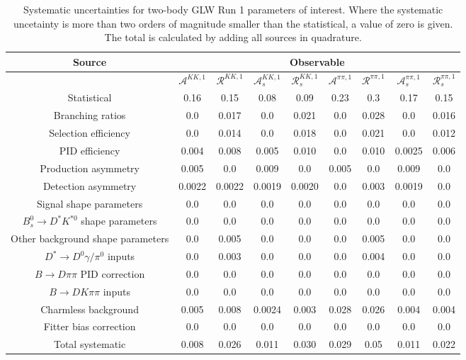 \begin{sidewaystable}
  \centering
  \begin{tabular}{ccccccccc}
      \toprule
      Source & \multicolumn{8}{c}{Observable} \\
      \midrule
       & $\mathcal{A}^{KK,1}$ & $\mathcal{R}^{KK,1}$ & $\mathcal{A}_s^{KK,1}$ & $\mathcal{R}_{s}^{KK,1}$ & $\mathcal{A}^{\pi\pi,1}$ & $\mathcal{R}^{\pi\pi,1}$ & $\mathcal{A}_s^{\pi\pi,1}$ & $\mathcal{R}_{s}^{\pi\pi,1}$ \\
      \midrule
      Statistical & 0.16 & 0.15 & 0.08 & 0.09 & 0.23 & 0.3 & 0.17 & 0.15 \\
      \midrule
      Branching ratios & 0.0  & 0.017 & 0.0  & 0.021 & 0.0  & 0.028 & 0.0  & 0.016 \\
      Selection efficiency & 0.0  & 0.014 & 0.0  & 0.018 & 0.0  & 0.021 & 0.0  & 0.012 \\
      PID efficiency & 0.004 & 0.008 & 0.005 & 0.010 & 0.0  & 0.010 & 0.0025 & 0.006 \\
      Production asymmetry & 0.005 & 0.0  & 0.009 & 0.0  & 0.005 & 0.0  & 0.009 & 0.0  \\
      Detection asymmetry & 0.0022 & 0.0022 & 0.0019 & 0.0020 & 0.0  & 0.003 & 0.0019 & 0.0  \\
      Signal shape parameters & 0.0  & 0.0  & 0.0  & 0.0  & 0.0  & 0.0  & 0.0  & 0.0  \\
      $B^0_s \to D^* K^{*0}$ shape parameters & 0.0  & 0.0  & 0.0  & 0.0  & 0.0  & 0.0  & 0.0  & 0.0  \\
      Other background shape parameters & 0.0  & 0.005 & 0.0  & 0.0  & 0.0  & 0.005 & 0.0  & 0.0  \\
      $D^* \to D^0 \gamma/\pi^0$ inputs & 0.0  & 0.003 & 0.0  & 0.0  & 0.0  & 0.004 & 0.0  & 0.0  \\
      $B\to D\pi\pi$ PID correction & 0.0  & 0.0  & 0.0  & 0.0  & 0.0  & 0.0  & 0.0  & 0.0  \\
      $B\to DK\pi\pi$ inputs & 0.0  & 0.0  & 0.0  & 0.0  & 0.0  & 0.0  & 0.0  & 0.0  \\
      Charmless background & 0.005 & 0.008 & 0.0024 & 0.003 & 0.028 & 0.026 & 0.004 & 0.004 \\
      Fitter bias correction & 0.0  & 0.0  & 0.0  & 0.0  & 0.0  & 0.0  & 0.0  & 0.0  \\
      \midrule
      Total systematic & 0.008 & 0.026 & 0.011 & 0.030 & 0.029 & 0.05 & 0.011 & 0.022 \\
      \bottomrule
  \end{tabular}
  \caption{Systematic uncertainties for two-body GLW Run 1 parameters of interest. Where the systematic uncetainty is more than two orders of magnitude smaller than the statistical, a value of zero is given. The total is calculated by adding all sources in quadrature.}
\label{tab:twoBody_GLW_run1_systematics}
\end{sidewaystable}
